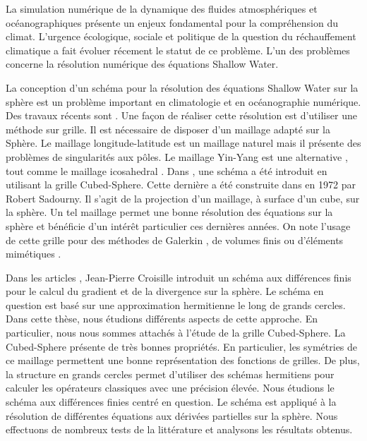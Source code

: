 La simulation numérique de la dynamique des fluides atmosphériques et océanographiques présente un enjeux fondamental pour la compréhension du climat. L'urgence écologique, sociale et politique de la question du réchauffement climatique a fait évoluer récement le statut de ce problème. L'un des problèmes concerne la résolution numérique des équations Shallow Water.

La conception d'un schéma pour la résolution des équations Shallow Water sur la sphère est un problème important en climatologie et en océanographie numérique. Des travaux récents sont \cite{Nair2010, Qaddouri2012, Ullrich2011}. Une façon de réaliser cette résolution est d'utiliser une méthode sur grille. Il est nécessaire de disposer d'un maillage adapté sur la Sphère. Le maillage longitude-latitude est un maillage naturel mais il présente des problèmes de singularités aux pôles. Le maillage Yin-Yang est une alternative \cite{Kageyama2004, Li2008}, tout comme le maillage icosahedral \cite{Stuhne1999}. 
Dans \cite{Croisille2015, Croisille2013}, une schéma a été introduit en utilisant la grille Cubed-Sphere. Cette dernière a été construite dans \cite{Sadourny1972} en 1972 par Robert Sadourny. Il s'agit de la projection d'un maillage, à surface d'un cube, sur la sphère. Un tel maillage permet une bonne résolution des équations sur la sphère \cite{Ronchi1996} et bénéficie d'un intérêt particulier ces dernières années. On note l'usage de cette grille pour des méthodes de Galerkin \cite{Nair2010}, de volumes finis \cite{Chen2008,Ullrich2011} ou d'éléments mimétiques \cite{Lauritzen2010}.

Dans les articles \cite{Croisille2015,Croisille2013}, Jean-Pierre Croisille introduit un schéma aux différences finis pour le calcul du gradient et de la divergence sur la sphère. Le schéma en question est basé sur une approximation hermitienne le long de grands cercles. Dans cette thèse, nous étudions différents aspects de cette approche. En particulier, nous nous sommes attachés à l'étude de la grille Cubed-Sphere. La Cubed-Sphere présente de très bonnes propriétés. En particulier, les symétries de ce maillage permettent une bonne représentation des fonctions de grilles. De plus, la structure en grands cercles permet d'utiliser des schémas hermitiens pour calculer les opérateurs classiques avec une précision élevée. Nous étudions le schéma aux différences finies centré en question. Le schéma est appliqué à la résolution de différentes équations aux dérivées partielles sur la sphère. Nous effectuons de nombreux tests de la littérature et analysons les résultats obtenus.





